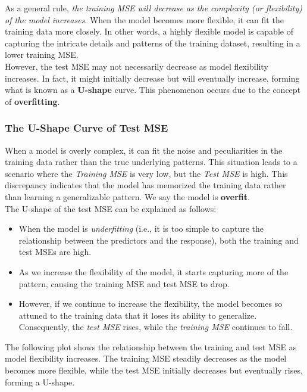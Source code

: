 As a general rule, \textit{the training MSE will decrease as the complexity (or flexibility) of the model increases}. When the model becomes more flexible, it can fit the training data more closely. In other words, a highly flexible model is capable of capturing the intricate details and patterns of the training dataset, resulting in a lower training MSE.\\

However, the test MSE may not necessarily decrease as model flexibility increases. In fact, it might initially decrease but will eventually increase, forming what is known as a \textbf{U-shape} curve. This phenomenon occurs due to the concept of \textbf{overfitting}.

\subsubsection{The U-Shape Curve of Test MSE}

When a model is overly complex, it can fit the noise and peculiarities in the training data rather than the true underlying patterns. This situation leads to a scenario where the \textit{Training MSE} is very low, but the \textit{Test MSE} is high. This discrepancy indicates that the model has memorized the training data rather than learning a generalizable pattern. We say the model is \textbf{overfit}.\\

The U-shape of the test MSE can be explained as follows: 

\begin{itemize}
    \item When the model is \textit{underfitting} (i.e., it is too simple to capture the relationship between the predictors and the response), both the training and test MSEs are high.
    \item As we increase the flexibility of the model, it starts capturing more of the pattern, causing the training MSE and test MSE to drop.
    \item However, if we continue to increase the flexibility, the model becomes so attuned to the training data that it loses its ability to generalize. Consequently, the \textit{test MSE} rises, while the \textit{training MSE} continues to fall.
\end{itemize}

The following plot shows the relationship between the training and test MSE as model flexibility increases. The training MSE steadily decreases as the model becomes more flexible, while the test MSE initially decreases but eventually rises, forming a U-shape.

